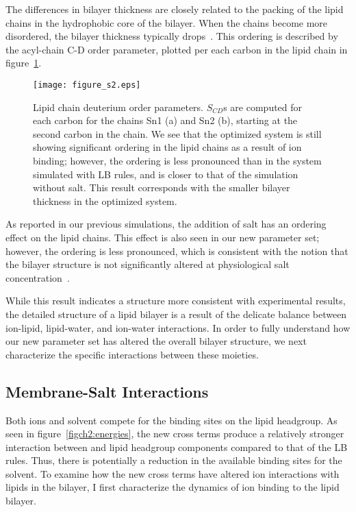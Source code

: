 The differences in bilayer thickness are closely related to the
packing of the lipid chains in the hydrophobic core of the bilayer. 
When the chains become more disordered, 
the bilayer thickness typically drops~\cite{nagle:2000}. 
This ordering is described by the acyl-chain C-D order parameter, 
plotted per each carbon in the lipid chain in figure~\ref{figch2:op}. 
\begin{figure}[H]
    \caption[Lipid chain deuterium order parameters.]{ Lipid chain deuterium order parameters. $S_{CD}$s are computed for each carbon
        for the chains Sn1 (a) and Sn2 (b), starting at the second carbon in the chain. We see that the optimized system is still showing significant ordering in the lipid
    chains as a result of ion binding; however, the ordering is less pronounced than in the system simulated with LB rules, 
    and is closer to that of the simulation without salt. This
result corresponds with the smaller bilayer thickness in the optimized system.
}
    \label{figch2:op}
    \texttt{[image: figure\_s2.eps]}
\end{figure}
As reported in our previous simulations, 
the addition of salt has an ordering effect on the lipid chains. 
This effect is also seen in our new parameter set; however, the ordering is less pronounced, 
which is consistent with the notion that the bilayer structure is not significantly altered 
at physiological salt concentration~\cite{pabst:2007,petrache:2006:swelling}.

While this result indicates a structure more consistent with experimental results, 
the detailed structure of a lipid bilayer is a result of the
delicate balance between ion-lipid, lipid-water, and ion-water interactions.
In order to fully understand how our new parameter set has altered the
overall bilayer structure, we next characterize the specific interactions
between these moieties.

\subsection{Membrane-Salt Interactions}

Both ions and solvent compete for the binding sites on the lipid headgroup. 
As seen in figure~\ref{figch2:energies}, the new cross terms
produce a relatively stronger interaction between \na{} and lipid
headgroup components compared to that of the LB rules. 
Thus, there is potentially a reduction in the available binding sites for the solvent. 
To examine how the new cross terms have altered ion interactions with lipids in the bilayer, 
I first characterize the dynamics of ion binding to the lipid bilayer.

